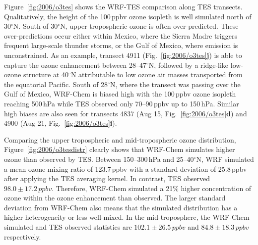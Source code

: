 Figure~\ref{fig:2006/o3tes} shows the WRF-TES comparison along TES transects. Qualitatively, the height of the 100\,\unit{ppbv} ozone
isopleth is well simulated north of 30$^\circ$N. South of 30$^\circ$N, upper tropospheric ozone is often over-predicted. These over-predictions
occur either within Mexico, where the Sierra Madre triggers frequent large-scale thunder storms, or the Gulf of Mexico, where {\lnox}
emission is unconstrained. As an example, transect 4911 (Fig.~\ref{fig:2006/o3tes}{\bf j}) is able to capture the ozone enhancement
between 28--47$^\circ$N, followed by a ridge-like low-ozone structure at 40$^\circ$N attributable to low ozone air masses transported
from the equatorial Pacific. South of 28$^\circ$N, where the transect was passing over the Gulf of Mexico, WRF-Chem is biased high
with the 100\,\unit{ppbv} ozone isopleth reaching 500\,\unit{hPa} while TES observed only 70--90\,\unit{ppbv} up to 150\,\unit{hPa}.
Similar high biases are also seen for transects 4837 (Aug 15, Fig.~\ref{fig:2006/o3tes}{\bf d}) and 4900 (Aug 21,
Fig.~\ref{fig:2006/o3tes}{\bf i}).

Comparing the upper tropospheric and mid-tropospheric ozone distribution, Figure~\ref{fig:2006/o3tesdistr} clearly shows that WRF-Chem
simulates higher ozone than observed by TES. Between 150--300\,\unit{hPa} and 25--40$^\circ$N, WRF simulated
a mean ozone mixing ratio of 123.7\,\unit{ppbv} with a standard deviation of 25.8\,\unit{ppbv} after applying the TES averaging kernel. In contrast,
TES observed $98.0\pm17.2\,\unit{ppbv}$. Therefore, WRF-Chem simulated a 21\% higher concentration of ozone within the ozone
enhancement than observed. The larger standard deviation from WRF-Chem also means that the simulated distribution has a higher
heterogeneity or less well-mixed. In the mid-troposphere, the WRF-Chem simulated and TES observed statistics are $102.1\pm26.5\,\unit{ppbv}$
and $84.8\pm18.3\,\unit{ppbv}$ respectively.

